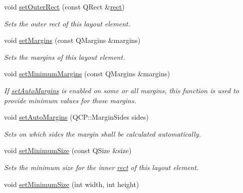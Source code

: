 \begin{DoxyCompactItemize}
\item 
void \hyperlink{classQCPLayoutElement_a38975ea13e36de8e53391ce41d94bc0f}{set\+Outer\+Rect} (const Q\+Rect \&\hyperlink{classQCPLayoutElement_affdfea003469aac3d0fac5f4e06171bc}{rect})
\begin{DoxyCompactList}\small\item\em Sets the outer rect of this layout element. \end{DoxyCompactList}\item 
void \hyperlink{classQCPLayoutElement_a8f450b1f3f992ad576fce2c63d8b79cf}{set\+Margins} (const Q\+Margins \&margins)
\begin{DoxyCompactList}\small\item\em Sets the margins of this layout element. \end{DoxyCompactList}\item 
void \hyperlink{classQCPLayoutElement_a0a8a17abc16b7923159fcc7608f94673}{set\+Minimum\+Margins} (const Q\+Margins \&margins)
\begin{DoxyCompactList}\small\item\em If \hyperlink{classQCPLayoutElement_accfda49994e3e6d51ed14504abf9d27d}{set\+Auto\+Margins} is enabled on some or all margins, this function is used to provide minimum values for those margins. \end{DoxyCompactList}\item 
void \hyperlink{classQCPLayoutElement_accfda49994e3e6d51ed14504abf9d27d}{set\+Auto\+Margins} (Q\+C\+P\+::\+Margin\+Sides sides)
\begin{DoxyCompactList}\small\item\em Sets on which sides the margin shall be calculated automatically. \end{DoxyCompactList}\item 
void \hyperlink{classQCPLayoutElement_a5dd29a3c8bc88440c97c06b67be7886b}{set\+Minimum\+Size} (const Q\+Size \&size)
\begin{DoxyCompactList}\small\item\em Sets the minimum size for the inner \hyperlink{classQCPLayoutElement_affdfea003469aac3d0fac5f4e06171bc}{rect} of this layout element. \end{DoxyCompactList}\item 
\hypertarget{classQCPLayoutElement_a8e0447614a0bf92de9a7304588c6b96e}{}void \hyperlink{classQCPLayoutElement_a8e0447614a0bf92de9a7304588c6b96e}{set\+Minimum\+Size} (int width, int height)\label{classQCPLayoutElement_a8e0447614a0bf92de9a7304588c6b96e}


\end{DoxyCompactItemize}

